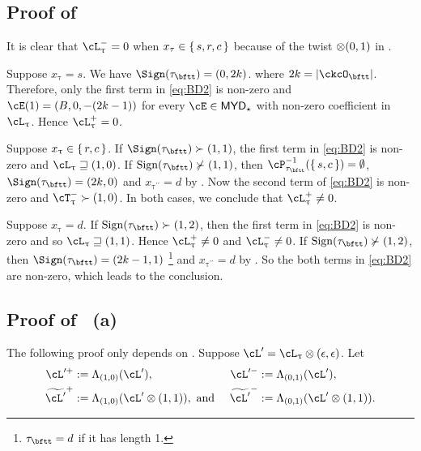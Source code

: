 \documentclass[12pt,a4paper]{amsart}
\def\abs#1{\left|{#1}\right|}
\def\MYD{{\mathsf{MYD}}}
\def\pac#1{\ac_{#1}^+}
\def\nac#1{\ac_{#1}^-}
\numberwithin{equation}{section}
\theoremstyle{remark}
\def\ssign{\mathrm{Sign}}
\def\ncT{\cT^-}
\def\uptaupp{\uptau^{\prime\prime}}
\begin{document}
\subsection*{\bf Proof of  }


It is clear that $\nac{\uptau}=0$ when $x_{\tau}\in \set{s,r,c}$ because of
the twist $\otimes(0, 1)$ in .

  \begin{enumPF}
    \item  Suppose $x_{\uptau}=s$. We have $\Sign(\tau_{\bftt})=(0,2k)$.
    where $2k= \abs{\ckcO_{\bftt}}$.
    Therefore, only the first term in  \eqref{eq:BD2} is non-zero and
    $\cE(1) = (B,0,-(2k-1))$ for every $\cE\in \MYD_{\star}$ with non-zero
    coefficient in
    $\ac_{\uptau}$.
    Hence $\pac{\uptau}=0$.
    \item Suppose $x_{\uptau} \in \set{r,c}$. If
    $\Sign(\tau_{\bftt})\succ(1,1)$, the first term in \eqref{eq:BD2} is
    non-zero and $\ac_{\uptau} \sqsupseteq (1,0)$. If
    $\ssign(\tau_{\bftt})\nsucc (1,1)$, then
    $\cP_{\tau_{\bftt}}^{-1}(\set{s,c})=\emptyset$, $\Sign(\tau_{\bftt})=(2k,0)$
    and $x_{\uptaupp}=d$ by . Now the second term of
    \eqref{eq:BD2} is non-zero and $\ncT_{\uptau}\succ (1,0)$.
    In both cases, we conclude that $\pac{\uptau}\neq 0$.
    \item Suppose $x_{\uptau}=d$. If $\ssign(\tau_{\bftt})\succ (1,2)$,
    then the first term in \eqref{eq:BD2} is non-zero and so
    $\ac_{\uptau}\sqsupseteq (1,1)$. Hence $\pac{\uptau}\neq 0$ and
    $\nac{\uptau}\neq 0$.
    If  $\ssign(\tau_{\bftt})\nsucc(1,2)$, then $\Sign(\tau_{\bftt}) = (2k-1,1)$
    \footnote{$\tau_{\bftt}=d$ if it has length 1.} and
    $x_{\uptaupp}=d$ by .
    So the both terms in \eqref{eq:BD2} are non-zero, which leads to the conclusion.
  \end{enumPF}

\subsection*{\bf Proof of ~(a) }
\def\opac{\cL'^+}
\def\onac{\cL'^-}
\def\tpac{\widetilde{\cL'}^+}
\def\tnac{\widetilde{\cL'}^-}
The following proof only depends on .
Suppose $\cL' = \ac_{\uptau}\lotimes (\epsilon,\epsilon)$.
Let
  \begin{align*}
    \opac &:= \Lambda_{(1,0)}(\cL'), &
    \onac &:= \Lambda_{(0,1)}(\cL'), \\
    \tpac &:= \Lambda_{(1,0)}(\cL'\lotimes (1,1)),\text{ and } &
    \tnac &:= \Lambda_{(0,1)}(\cL'\lotimes (1,1)).
  \end{align*}
\end{document}
